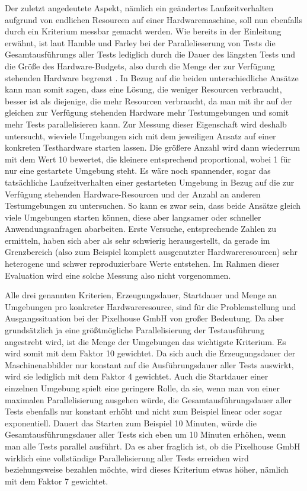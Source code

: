 Der zuletzt angedeutete Aspekt, nämlich ein geändertes Laufzeitverhalten aufgrund von endlichen Resourcen auf einer Hardwaremaschine, soll nun ebenfalls durch ein Kriterium messbar gemacht werden. Wie bereits in der Einleitung erwähnt, ist laut Hamble und Farley bei der Parallelieserung von Tests die Gesamtausführungs aller Tests lediglich durch die Dauer des längsten Tests und die Größe des Hardware-Budgets, also durch die Menge der zur Verfügung stehenden Hardware begrenzt \citep[Vgl.][S. 310]{HumFar10}. In Bezug auf die beiden unterschiedliche Ansätze kann man somit sagen, dass eine Lösung, die weniger Resourcen verbraucht, besser ist als diejenige, die mehr Resourcen verbraucht, da man mit ihr auf der gleichen zur Verfügung stehenden Hardware mehr Testumgebungen und somit mehr Tests parallelisieren kann. Zur Messung dieser Eigenschaft wird deshalb untersucht, wieviele Umgebungen sich mit dem jeweiligen Ansatz auf einer konkreten Testhardware starten lassen. Die größere Anzahl wird dann wiederrum mit dem Wert 10 bewertet, die kleinere entsprechend proportional, wobei 1 für nur eine gestartete Umgebung steht. Es wäre noch spannender, sogar das tatsächliche Laufzeitverhalten einer gestarteten Umgebung in Bezug auf die zur Verfügung stehenden Hardware-Resourcen und der Anzahl an anderen Testumgebungen zu untersuchen. So kann es zwar sein, dass beide Ansätze gleich viele Umgebungen starten können, diese aber langsamer oder schneller Anwendungsanfragen abarbeiten. Erste Versuche, entsprechende Zahlen zu ermitteln, haben sich aber als sehr schwierig herausgestellt, da gerade im Grenzbereich (also zum Beispiel komplett ausgenutzter Hardwareresourcen) sehr heterogene und schwer reproduzierbare Werte entstehen. Im Rahmen dieser Evaluation wird eine solche Messung also nicht vorgenommen.

Alle drei genannten Kriterien, Erzeugungsdauer, Startdauer und Menge an Umgebungen pro konkreter Hardwareresource, sind für die Problemstellung und Ausgangssituation bei der Pixelhouse GmbH von großer Bedeutung. Da aber grundsätzlich ja eine größtmögliche Parallelisierung der Testausführung angestrebt wird, ist die Menge der Umgebungen das wichtigste Kriterium. Es wird somit mit dem Faktor 10 gewichtet. Da sich auch die Erzeugungsdauer der Maschinenabbilder nur konstant auf die Ausführungsdauer aller Tests auswirkt, wird sie lediglich mit dem Faktor 4 gewichtet. Auch die Startdauer einer einzelnen Umgebung spielt eine geringere Rolle, da sie, wenn man von einer maximalen Parallelisierung ausgehen würde, die Gesamtausführungsdauer aller Tests ebenfalls nur konstant erhöht und nicht zum Beispiel linear oder sogar exponentiell. Dauert das Starten zum Beispiel 10 Minuten, würde die Gesamtausführungsdauer aller Tests sich eben um 10 Minuten erhöhen, wenn man alle Tests parallel ausführt. Da es aber fraglich ist, ob die Pixelhouse GmbH wirklich eine vollständige Parallelisierung aller Tests erreichen wird beziehungsweise bezahlen möchte, wird dieses Kriterium etwas höher, nämlich mit dem Faktor 7 gewichtet.

